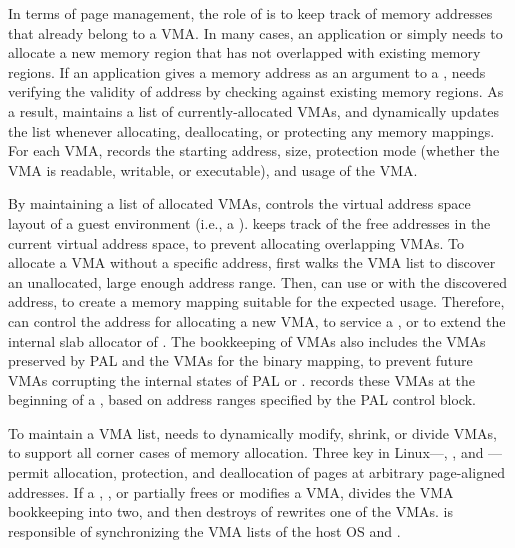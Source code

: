 In terms of page management,
the role of \thelibos{} is to keep track of memory addresses that already belong to a VMA.
In many cases,
an application or \thelibos{}
simply needs to allocate a new memory region that has not overlapped
with existing memory regions.
If an application gives a memory address
as an argument to a \linuxapi{},
\thelibos{} needs verifying the validity of address by checking against existing memory regions. 
As a result,
\thelibos{} maintains a list of currently-allocated VMAs,
and dynamically updates the list whenever allocating, deallocating, or protecting any memory mappings.
For each VMA, \thelibos{} records
the starting address, size, protection mode (whether the VMA is readable, writable, or executable), and usage of the VMA.




By maintaining a list of allocated VMAs,
\thelibos{} controls the virtual address space layout
of a guest environment (i.e., a \picoproc{}).
\thelibos{} keeps track of the free addresses in the current virtual address space,
to prevent allocating overlapping VMAs.
To allocate a VMA without a specific address,
\thelibos{} first walks the VMA list
to discover an unallocated, large enough address range.
Then, \thelibos{} can use  or  with the discovered address,
to create a memory mapping suitable for the expected usage.
Therefore, \thelibos{} can control the address
for allocating a new VMA,
to service a  \linuxapi{},
or to extend the internal slab allocator of \thelibos{}.
The bookkeeping of VMAs also includes
the VMAs preserved by PAL and the VMAs for the \thelibos{} binary mapping,
to prevent future VMAs
corrupting the internal states of PAL or \thelibos{}.
\thelibos{} records these VMAs at the beginning of a \picoproc{}, based on address ranges specified by the PAL control block.




To maintain a VMA list,
\thelibos{} needs to dynamically modify, shrink, or divide VMAs, to support all corner cases
of memory allocation.
Three key \linuxapis{} in Linux---, , and ---permit allocation, protection, and deallocation of pages
at arbitrary page-aligned addresses.
If a , , or  \linuxapi{}
partially frees or modifies a VMA,
\thelibos{} divides the VMA bookkeeping into two, and then destroys of rewrites one of the VMAs.
\thelibos{} is responsible of synchronizing the VMA lists of the host OS and \thelibos{}.



